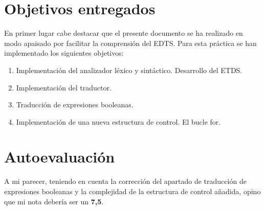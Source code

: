 \documentclass[12pt,a4paper,landscape]{article}
\theoremstyle{mytheor}
\begin{document}
\begin{titlepage}
  
  \vfill %
  
\end{titlepage}
\newpage
\tableofcontents
\newpage

\section{Objetivos entregados}
En primer lugar cabe destacar que el presente documento se ha realizado en modo apaisado por facilitar la comprensión del EDTS.
Para esta práctica se han implementado los siguientes objetivos:
\begin{enumerate}
\item Implementación del analizador léxico y sintáctico. Desarrollo del ETDS.
\item Implementación del traductor.
\item Traducción de expresiones booleanas.
\item Implementación de una nueva estructura de control. El bucle for.
\end{enumerate}


\section{Autoevaluación}
A mi parecer, teniendo en cuenta la corrección del apartado de traducción de expresiones booleanas y la complejidad de la estructura de control añadida, opino que mi nota debería ser un \textbf{7,5}.

\newpage
\end{document}
